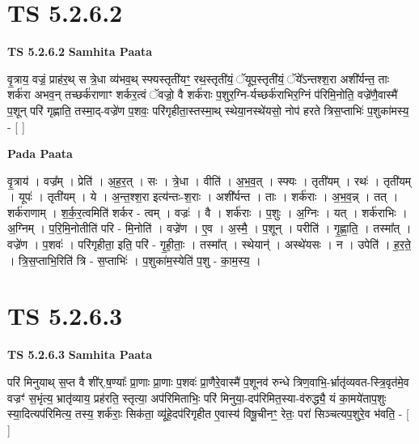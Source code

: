 \documentclass[17pt]{extarticle}
\begin{document}

\section{ TS 5.2.6.2 }

\textbf{TS 5.2.6.2 } \newline
\textbf{Samhita Paata} \newline

वृ॒त्राय॒ वज्रं॒ प्राह॑र॒थ् स त्रे॒धा व्य॑भव॒थ् स्फ्यस्तृती॑यꣳ॒॒ रथ॒स्तृती॑यं॒ ॅयूप॒स्तृती॑यं॒ ॅये᳚ऽन्तश्श॒रा अशी᳚र्यन्त॒ ताः शर्क॑रा अभव॒न् तच्छर्क॑राणाꣳ शर्कर॒त्वं ॅवज्रो॒ वै शर्क॑राः प॒शुर॒ग्नि-र्यच्छर्क॑राभिर॒ग्निं प॑रिमि॒नोति॒ वज्रे॑णै॒वास्मै॑ प॒शून् परि॑ गृह्णाति॒ तस्मा॒द्-वज्रे॑ण प॒शवः॒ परि॑गृहीता॒स्तस्मा॒थ् स्थेया॒नस्थे॑यसो॒ नोप॑ हरते त्रिस॒प्ताभिः॑ प॒शुका॑मस्य॒ - [  ] \newline

\textbf{Pada Paata} \newline

वृ॒त्राय॑ । वज्र᳚म् । प्रेति॑ । अ॒ह॒र॒त् । सः । त्रे॒धा । वीति॑ । अ॒भ॒व॒त् । स्फ्यः । तृती॑यम् । रथः॑ । तृती॑यम् । यूपः॑ । तृती॑यम् । ये । अ॒न्त॒श्श॒रा इत्य॑न्तः-श॒राः । अशी᳚र्यन्त । ताः । शर्क॑राः । अ॒भ॒व॒न्न् । तत् । शर्क॑राणाम् । श॒र्क॒र॒त्वमिति॑ शर्कर - त्वम् । वज्रः॑ । वै । शर्क॑राः । प॒शुः । अ॒ग्निः । यत् । शर्क॑राभिः । अ॒ग्निम् । प॒रि॒मि॒नोतीति॑ परि - मि॒नोति॑ । वज्रे॑ण । ए॒व । अ॒स्मै॒ । प॒शून् । परीति॑ । गृ॒ह्णा॒ति॒ । तस्मा᳚त् । वज्रे॑ण । प॒शवः॑ । परि॑गृहीता॒ इति॒ परि॑ - गृ॒ही॒ताः॒ । तस्मा᳚त् । स्थेयान्॑ । अस्थे॑यसः । न । उपेति॑ । ह॒र॒ते॒ । त्रि॒स॒प्ताभि॒रिति॑ त्रि - स॒प्ताभिः॑ । प॒शुका॑म॒स्येति॑ प॒शु - का॒म॒स्य॒ ।  \newline





\section{ TS 5.2.6.3 }

\textbf{TS 5.2.6.3 } \newline
\textbf{Samhita Paata} \newline

परि॑ मिनुयाथ् स॒प्त वै शी॑र्.ष॒ण्याः᳚ प्रा॒णाः प्रा॒णाः प॒शवः॑ प्रा॒णैरे॒वास्मै॑ प॒शूनव॑ रुन्धे त्रिण॒वाभि॒-र्भ्रातृ॑व्यवत-स्त्रि॒वृत॑मे॒व वज्रꣳ॑ स॒भृंत्य॒ भ्रातृ॑व्याय॒ प्रह॑रति॒ स्तृत्या॒ अप॑रिमिताभिः॒ परि॑ मिनुया॒-दप॑रिमित॒स्या-व॑रुद्ध्यै॒ यं का॒मये॑ताप॒शुः स्या॒दित्यप॑रिमित्य॒ तस्य॒ शर्क॑राः॒ सिक॑ता॒ व्यू॑हे॒दप॑रिगृहीत ए॒वास्य॑ विषू॒चीनꣳ॒॒ रेतः॒ परा॑ सिञ्चत्यप॒शुरे॒व भ॑वति॒ - [  ] \newline
\end{document}
